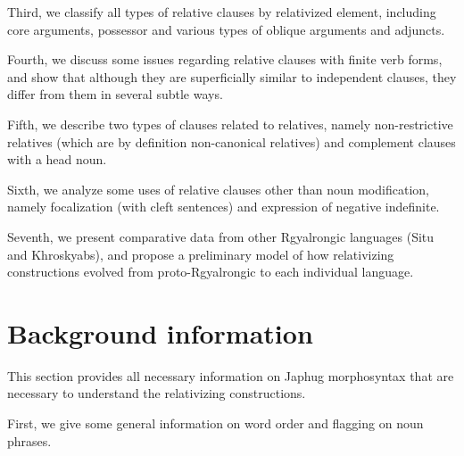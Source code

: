 \documentclass[oldfontcommands,oneside,a4paper,11pt]{article}
\begin{document}
Third, we classify all types of relative clauses by relativized element, including core arguments, possessor and various types of oblique arguments and adjuncts.

Fourth, we discuss some issues regarding relative clauses with finite verb forms, and show that although they are superficially similar to independent clauses, they differ from them in several subtle ways.

Fifth, we describe two types of clauses related to relatives, namely non-restrictive relatives (which are by definition non-canonical relatives) and complement clauses with a head noun.

Sixth, we analyze some uses of relative clauses other than noun modification, namely focalization (with cleft sentences) and expression of negative indefinite.

Seventh, we  present comparative data from other Rgyalrongic languages (Situ and Khroskyabs), and propose a preliminary model of how relativizing constructions evolved from proto-Rgyalrongic to each individual language.


  


\section{Background information}
This section provides all necessary information on Japhug morphosyntax that are necessary to understand the relativizing constructions. 

First, we give some general information on word order and flagging on noun phrases.
\end{document}
